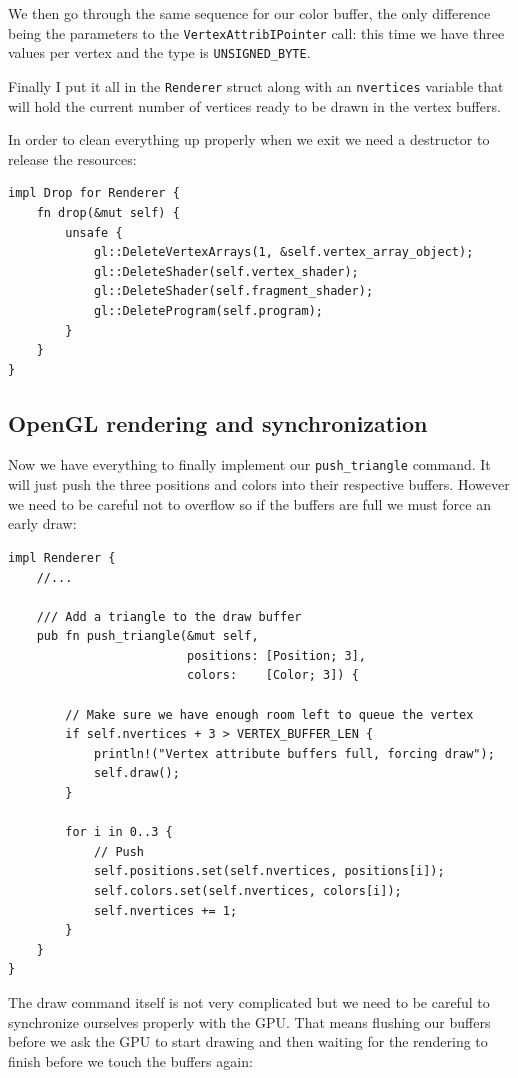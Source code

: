\documentclass[a4paper]{article}
\newcommand{\code}[1] {\texttt{#1}}
\begin{document}
We then go through the same sequence for our color buffer, the only
difference being the parameters to the \code{VertexAttribIPointer}
call: this time we have three values per vertex and the type is
\code{UNSIGNED\_BYTE}.

Finally I put it all in the \code{Renderer} struct along with an
\code{nvertices} variable that will hold the current number of
vertices ready to be drawn in the vertex buffers.

In order to clean everything up properly when we exit we need a
destructor to release the resources:

\begin{lstlisting}
impl Drop for Renderer {
    fn drop(&mut self) {
        unsafe {
            gl::DeleteVertexArrays(1, &self.vertex_array_object);
            gl::DeleteShader(self.vertex_shader);
            gl::DeleteShader(self.fragment_shader);
            gl::DeleteProgram(self.program);
        }
    }
}
\end{lstlisting}

\subsection{OpenGL rendering and synchronization}

Now we have everything to finally implement our \code{push\_triangle}
command. It will just push the three positions and colors into their
respective buffers. However we need to be careful not to overflow so
if the buffers are full we must force an early draw:

\begin{lstlisting}
impl Renderer {
    //...

    /// Add a triangle to the draw buffer
    pub fn push_triangle(&mut self,
                         positions: [Position; 3],
                         colors:    [Color; 3]) {

        // Make sure we have enough room left to queue the vertex
        if self.nvertices + 3 > VERTEX_BUFFER_LEN {
            println!("Vertex attribute buffers full, forcing draw");
            self.draw();
        }

        for i in 0..3 {
            // Push
            self.positions.set(self.nvertices, positions[i]);
            self.colors.set(self.nvertices, colors[i]);
            self.nvertices += 1;
        }
    }
}
\end{lstlisting}

The draw command itself is not very complicated but we need to be
careful to synchronize ourselves properly with the GPU. That means
flushing our buffers before we ask the GPU to start drawing and then
waiting for the rendering to finish before we touch the buffers again:
\end{document}
